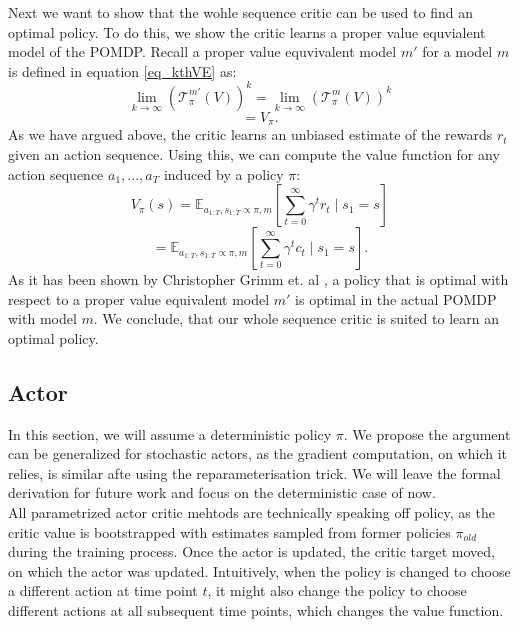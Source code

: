 Next we want to show that the wohle sequence critic can be used to find an optimal policy. 
To do this, we show the critic learns a proper value equvialent model of the POMDP. Recall a proper 
value equvivalent model $m'$ for a model $m$ is defined in equation \ref{eq_kthVE} as:
\begin{equation*}
   \lim_{k \rightarrow \infty} \left(\mathcal{T}^{m'}_{\pi}(V)\right)^k = \lim_{k \rightarrow \infty} \left(\mathcal{T}^{m}_{\pi}(V)\right)^k
\end{equation*}
\begin{equation}
    = V_{\pi}.
\end{equation}
As we have argued above, the critic learns an unbiased estimate of the rewards $r_t$ given an action sequence. Using this, we can compute the value function for 
any action sequence $a_1, ..., a_T$ induced by a policy $\pi$:
\begin{equation*}
    V_{\pi}(s) = \mathbb{E}_{a_{1:T}, s_{1:T} \propto \pi, m}\left[\sum_{t=0}^{\infty} \gamma^t r_t \mid s_1 = s\right]
\end{equation*}
$$=\mathbb{E}_{a_{1:T}, s_{1:T} \propto \pi, m}\left[\sum_{t=0}^{\infty} \gamma^t c_t \mid s_1 = s\right].$$
As it has been shown by Christopher Grimm et. al \cite{grimm2021proper}, a policy that is optimal with respect to a proper value equivalent model $m'$ is optimal 
in the actual POMDP with model $m$. We conclude, that our whole sequence critic is suited to learn an optimal policy.

\subsection{Actor}
\label{sec:AC_actor}
In this section, we will assume a deterministic policy $\pi$. We propose the argument can be generalized for stochastic actors, as the gradient computation, on which it relies, 
is similar afte using the reparameterisation trick. 
We will leave the formal derivation for future work and focus on the deterministic case of now.\\

All parametrized actor critic mehtods are technically speaking off policy, as the critic value is bootstrapped with estimates sampled from former policies $\pi_{old}$ during the training process. 
Once the actor is updated, the 
critic target moved, on which the actor was updated. Intuitively, when the policy is changed to choose a different action at time point $t$, it might also change 
the policy to choose different actions at 
all subsequent time points, which changes the value function. \\

